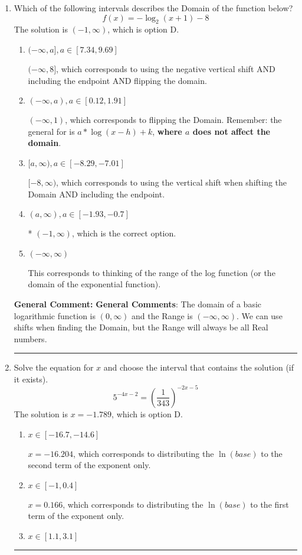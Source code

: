 \documentclass{extbook}[14pt]
\newcommand{\litem}[1]{\item #1

\rule{\textwidth}{0.4pt}}
\begin{document}
\begin{enumerate}\litem{
Which of the following intervals describes the Domain of the function below?
\[ f(x) = -\log_2{(x+1)}-8 \]The solution is \( (-1, \infty) \), which is option D.\begin{enumerate}[label=\Alph*.]
\item \( (-\infty, a], a \in [7.34, 9.69] \)

$(-\infty, 8]$, which corresponds to using the negative vertical shift AND including the endpoint AND flipping the domain.
\item \( (-\infty, a), a \in [0.12, 1.91] \)

$(-\infty, 1)$, which corresponds to flipping the Domain. Remember: the general for is $a*\log(x-h)+k$, \textbf{where $a$ does not affect the domain}.
\item \( [a, \infty), a \in [-8.29, -7.01] \)

$[-8, \infty)$, which corresponds to using the vertical shift when shifting the Domain AND including the endpoint.
\item \( (a, \infty), a \in [-1.93, -0.7] \)

* $(-1, \infty)$, which is the correct option.
\item \( (-\infty, \infty) \)

This corresponds to thinking of the range of the log function (or the domain of the exponential function).
\end{enumerate}

\textbf{General Comment:} \textbf{General Comments}: The domain of a basic logarithmic function is $(0, \infty)$ and the Range is $(-\infty, \infty)$. We can use shifts when finding the Domain, but the Range will always be all Real numbers.
}
\litem{
Solve the equation for $x$ and choose the interval that contains the solution (if it exists).
\[ 5^{-4x-2} = \left(\frac{1}{343}\right)^{-2x-5} \]The solution is \( x = -1.789 \), which is option D.\begin{enumerate}[label=\Alph*.]
\item \( x \in [-16.7, -14.6] \)

$x = -16.204$, which corresponds to distributing the $\ln(base)$ to the second term of the exponent only.
\item \( x \in [-1, 0.4] \)

$x = 0.166$, which corresponds to distributing the $\ln(base)$ to the first term of the exponent only.
\item \( x \in [1.1, 3.1] \)


\end{enumerate}}
\end{enumerate}
\end{document}
